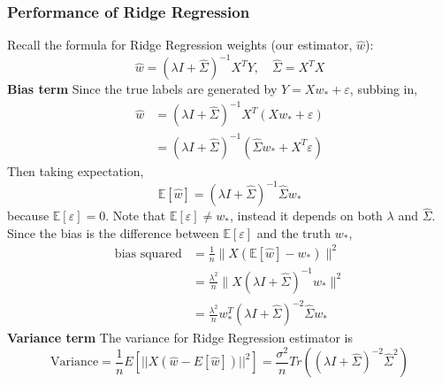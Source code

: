 \documentclass[../Probability.tex]{subfiles}
\begin{document}
\subsubsection{Performance of Ridge Regression}
Recall the formula for Ridge Regression weights (our estimator, $\hat{w}$):
$$\hat{w} = (\lambda I + \hat{\Sigma})^{-1} X^T Y, \quad \hat{\Sigma} = X^TX$$
\textbf{Bias term}\newline
Since the true labels are generated by $Y = Xw_* + \varepsilon$, subbing in,
\begin{align*}
    \hat{w} &= (\lambda I + \hat{\Sigma})^{-1} X^T (Xw_* + \varepsilon)\\
    &= (\lambda I + \hat{\Sigma})^{-1} (\hat{\Sigma} w_* + X^T \varepsilon)
\end{align*}
Then taking expectation,
$$\mathbb{E}[\hat{w}] = (\lambda I + \hat{\Sigma})^{-1}\hat{\Sigma} w_*$$
because $\mathbb{E}[\varepsilon]=0$.\newline
Note that $\mathbb{E}[\varepsilon]\neq w_*$, instead it depends on both $\lambda$ and $\hat{\Sigma}$.\newline
Since the bias is the difference between $\mathbb{E}[\varepsilon]$ and the truth $w_*$,
\begin{align*}
    \text{bias squared} &= \frac{1}{n}\|X(\mathbb{E}[\hat{w}] - w_*)\|^2\\
    &= \frac{\lambda^2}{n}\|X(\lambda I + \hat{\Sigma})^{-1}w_*\|^2\\
    &= \frac{\lambda^2}{n} w_*^T (\lambda I + \hat{\Sigma})^{-2} \hat{\Sigma} w_*
\end{align*}
\textbf{Variance term}\newline
The variance for Ridge Regression estimator is
$$\text{Variance} = \frac{1}{n} E[||X(\hat{w} - E[\hat{w}])||^2] = \frac{\sigma^2}{n} Tr((\lambda I + \hat{\Sigma})^{-2} \hat{\Sigma}^2)$$
\end{document}
